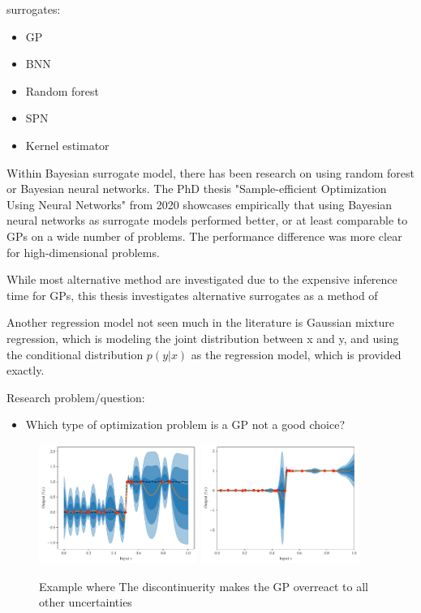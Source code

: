 surrogates: 
\begin{itemize}
    \item GP
    \item BNN
    \item Random forest
    \item SPN
    \item Kernel estimator
\end{itemize}

Within Bayesian surrogate model, there has been research on using random forest or Bayesian neural 
networks. The PhD thesis "Sample-efficient Optimization Using Neural Networks" from 2020 \cite{PhDthesis}
showcases empirically that using Bayesian neural networks as surrogate models performed better,
or at least comparable to GPs on a wide number of problems. The performance difference was more
clear for high-dimensional problems. 

While most alternative method are investigated due to the expensive inference time for GPs, 
this thesis investigates alternative surrogates as a method of 

Another regression model not seen much in the literature is Gaussian mixture regression, which
is modeling the joint distribution between x and y, and using the conditional distribution $p(y|x)$
as the regression model, which is provided exactly. 

Research problem/question:
\begin{itemize}
    \item Which type of optimization problem is a GP not a good choice?
\end{itemize}

\begin{figure}[H]%
    \centering
    {\includegraphics[width=0.46\textwidth]{Pictures/GP_vs_BNN1.pdf} }%
    \qquad
   {\includegraphics[width=0.46\textwidth]{Pictures/GP_vs_BNN2.pdf} }%
    \caption{Example where The discontinuerity makes the GP overreact to all other 
    uncertainties}%
    \label{fig:example}%
\end{figure}


